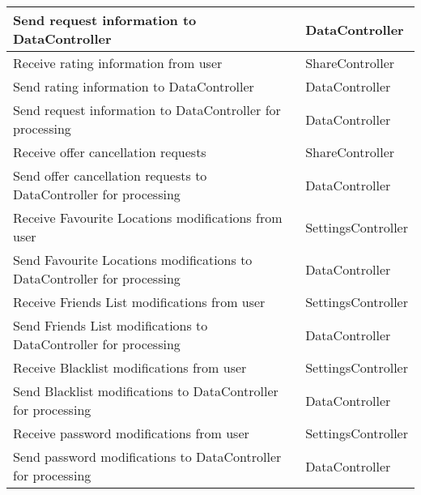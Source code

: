 \documentclass[english]{article}
\begin{document}
\begin{table}[!ht]
\begin{tabular}{|p{8cm}|p{4cm}|}
        Send request information to DataController & DataController \\
        \hline
        Receive rating information from user & ShareController \\
        \hline
        Send rating information to DataController & DataController \\
        \hline
        Send request information to DataController for processing & DataController \\
        \hline
        Receive offer cancellation requests & ShareController \\
        \hline
        Send offer cancellation requests to DataController for processing & DataController \\
        \hline
        Receive Favourite Locations modifications from user & SettingsController \\
        \hline
        Send Favourite Locations modifications to DataController for processing & DataController \\
        \hline
        Receive Friends List modifications from user & SettingsController \\
        \hline
        Send Friends List modifications to DataController for processing & DataController \\
        \hline
        Receive Blacklist modifications from user & SettingsController \\
        \hline
        Send Blacklist modifications to DataController for processing & DataController \\
        \hline
        Receive password modifications from user & SettingsController \\
        \hline
        Send password modifications to DataController for processing & DataController \\
        \hline
        \end{tabular}
    \end{table} 
    
\end{document}
